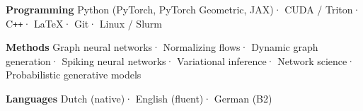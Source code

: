 \documentclass[10pt,a4paper]{article}
\begin{document}
{\small
\textbf{Programming}\enspace
Python (PyTorch, PyTorch Geometric, JAX)\enspace·\enspace
CUDA / Triton\enspace·\enspace
C\texttt{++}\enspace·\enspace
\LaTeX\enspace·\enspace
Git\enspace·\enspace
Linux / Slurm

\vspace{0.25em}

\textbf{Methods}\enspace
Graph neural networks\enspace·\enspace
Normalizing flows\enspace·\enspace
Dynamic graph generation\enspace·\enspace
Spiking neural networks\enspace·\enspace
Variational inference\enspace·\enspace
Network science\enspace·\enspace
Probabilistic generative models

\vspace{0.25em}

\textbf{Languages}\enspace
Dutch (native)\enspace·\enspace
English (fluent)\enspace·\enspace
German (B2)
}
\end{document}
